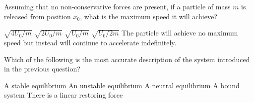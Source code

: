\documentclass{../../oss-apphys-exam}
\begin{document}
\begin{multicols*}{2}
\begin{questions}

    \question Assuming that no non-conservative forces are present, if a
    particle of mass $m$ is released from position $x_0$, what is the maximum
    speed it will achieve?
    \label{q:well1}
    \begin{choices}
      \choice $\sqrt{4U_0/m}$
      \choice $\sqrt{2U_0/m}$
      \choice $\sqrt{U_0/m}$
      \choice $\sqrt{U_0/2m}$
      \choice The particle will achieve no maximum speed but instead will
      continue to accelerate indefinitely.
    \end{choices}
    
    \question Which of the following is the most accurate description of the
    system introduced in the previous question?
    \label{q:well2}
    \begin{choices}
      \choice A stable equilibrium
      \choice An unstable equilibrium
      \choice A neutral equilibrium
      \choice A bound system
      \choice There is a linear restoring force
    \end{choices}
    \vspace{.7in}
    


\end{questions}
\end{multicols*}
\end{document}
